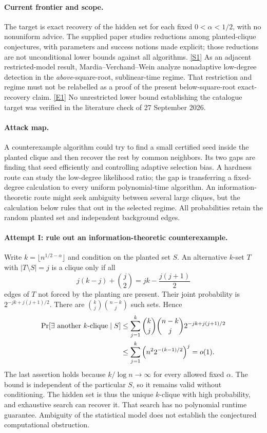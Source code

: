 \documentclass[11pt,a4paper]{article}
\newcommand{\sref}[2]{\hyperlink{source:#1:#2}{[S#2]}}
\newcommand{\eref}[2]{\hyperlink{extra:#1:#2}{[E#2]}}
\numberwithin{equation}{section}
\begin{document}
\paragraph{Current frontier and scope.}
The target is exact recovery of the hidden set for each fixed
$0<\alpha<1/2$, with no nonuniform advice.  The supplied paper studies
reductions among planted-clique conjectures, with parameters and success
notions made explicit; those reductions are not unconditional lower
bounds against all algorithms. \sref{132}{1}
As an adjacent restricted-model result, Mardia--Verchand--Wein analyze
nonadaptive low-degree detection in the \emph{above}-square-root,
sublinear-time regime.  That restriction and regime must not be
relabelled as a proof of the present below-square-root exact-recovery
claim. \eref{132}{1}  No unrestricted lower bound establishing the
catalogue target was verified in the literature check of
27 September 2026.

\paragraph{Attack map.}
A counterexample algorithm could try to find a small certified seed
inside the planted clique and then recover the rest by common neighbors.
Its two gaps are finding that seed efficiently and controlling adaptive
selection bias.  A hardness route can study the low-degree likelihood
ratio; the gap is transferring a fixed-degree calculation to every
uniform polynomial-time algorithm.  An information-theoretic route
might seek ambiguity between several large cliques, but the calculation
below rules that out in the selected regime.  All probabilities retain
the random planted set and independent background edges.

\paragraph{Attempt I: rule out an information-theoretic counterexample.}
Write $k=\lfloor n^{1/2-\alpha}\rfloor$ and condition on the planted
set $S$.  An alternative $k$-set $T$ with $|T\setminus S|=j$ is a
clique only if all
\[
 j(k-j)+\binom j2=jk-\frac{j(j+1)}2
\]
edges of $T$ not forced by the planting are present.  Their joint
probability is $2^{-jk+j(j+1)/2}$.  There are
$\binom kj\binom{n-k}j$ such sets.  Hence
\begin{align}\label{132:unique}
 \Pr[\exists\text{ another $k$-clique}\mid S]
 &\leq\sum_{j=1}^{k}\binom kj\binom{n-k}j
                  2^{-jk+j(j+1)/2}\\
 &\leq\sum_{j=1}^{k}\left(n^2 2^{-(k-1)/2}\right)^j=o(1).\notag
\end{align}
The last assertion holds because $k/\log n\to\infty$ for every
allowed fixed $\alpha$.  The bound is independent of the particular
$S$, so it remains valid without conditioning.  The hidden set is thus
the unique $k$-clique with high probability, and exhaustive search can
recover it.  That search has no polynomial runtime guarantee.
Ambiguity of the statistical model does not establish the conjectured
computational obstruction.
\end{document}
